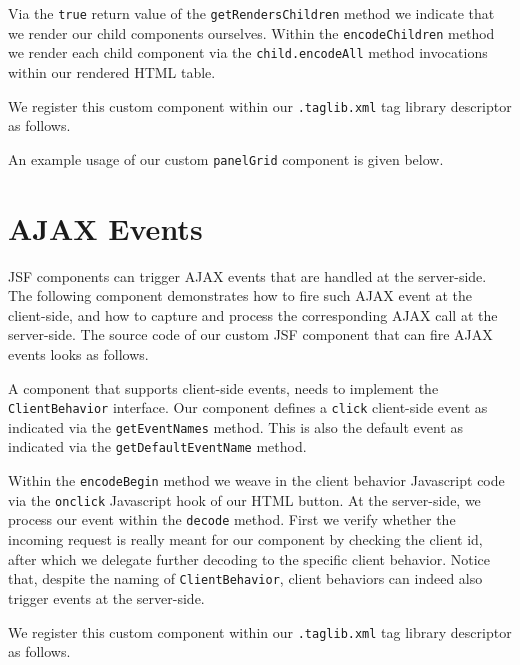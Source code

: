 Via the \texttt{true} return value of the \texttt{getRendersChildren} method we indicate that we render our child components ourselves.
Within the \texttt{encodeChildren} method we render each child component via the \texttt{child.encodeAll} method invocations within our rendered HTML table.

We register this custom component within our \texttt{.taglib.xml} tag library descriptor as follows.


An example usage of our custom \texttt{panelGrid} component is given below.



\section{AJAX Events}
JSF components can trigger AJAX events that are handled at the server-side.
The following component demonstrates how to fire such AJAX event at the client-side, and how to capture and process the corresponding AJAX call at the server-side.
The source code of our custom JSF component that can fire AJAX events looks as follows.

A component that supports client-side events, needs to implement the \texttt{ClientBehavior} interface.
Our component defines a \texttt{click} client-side event as indicated via the \texttt{getEvent\allowbreak  Names} method.
This is also the default event as indicated via the \texttt{getDefaultEventName} method.

Within the \texttt{encodeBegin} method we weave in the client behavior Javascript code via the \texttt{onclick} Javascript hook of our HTML button.
At the server-side, we process our event within the \texttt{decode} method.
First we verify whether the incoming request is really meant for our component by checking the client id, after which we delegate further decoding to the specific client behavior.
Notice that, despite the naming of \texttt{ClientBehavior}, client behaviors can indeed also trigger events at the server-side.

We register this custom component within our \texttt{.taglib.xml} tag library descriptor as follows.


